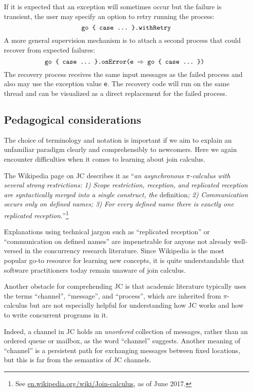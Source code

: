 \documentclass[sigplan,10pt]{acmart}\settopmatter{}
\begin{document}
If it is expected that an exception will sometimes occur but the failure
is transient, the user may specify an option to retry running the
process:
\[
\text{\texttt{go \{ case ...~\}.withRetry}}
\]
A more general supervision mechanism is to attach a second process
that could recover from expected failures:
\[
\text{\texttt{go \{ case ...~\}.onError(e \ensuremath{\Rightarrow} go \{ case ...~\}) }}
\]
The recovery process receives the same input messages as the failed
process and also may use the exception value \texttt{e}. The
recovery code will run on the same thread and can be visualized
as a direct replacement for the failed process.

\subsection{Pedagogical considerations}

The choice of terminology and notation is important if we aim to explain
an unfamiliar paradigm clearly and comprehensibly to newcomers. Here
we again encounter difficulties when it comes to learning about join
calculus. 

The Wikipedia page on JC describes it as ``\emph{an asynchronous
$\pi$-calculus with several strong restrictions: 1) Scope restriction,
reception, and replicated reception are syntactically merged into
a single construct, the }definition\emph{; 2) Communication occurs
only on defined names; 3) For every defined name there is exactly
one replicated reception.}''\footnote{ See \href{https://en.wikipedia.org/wiki/Join-calculus}{en.wikipedia.org/wiki/Join-calculus},
as of June 2017.}

Explanations using technical jargon such as ``replicated reception''
or ``communication on defined names'' are impenetrable for anyone
not already well-versed in the concurrency research literature. Since
Wikipedia is the most popular go-to resource for learning new concepts,
it is quite understandable that software practitioners today remain
unaware of join calculus.

Another obstacle for comprehending JC is that academic literature
typically uses the terms \textquotedblleft channel\textquotedblright ,
``message'', and ``process'', which are inherited from $\pi$-calculus
but are not especially helpful for understanding how JC works and
how to write concurrent programs in it.

Indeed, a channel in JC holds an \emph{unordered} collection of messages,
rather than an ordered queue or mailbox, as the word \textquotedblleft channel\textquotedblright{}
suggests. Another meaning of \textquotedblleft channel\textquotedblright{}
is a persistent path for exchanging messages between fixed locations,
but this is far from the semantics of JC channels.
\end{document}
